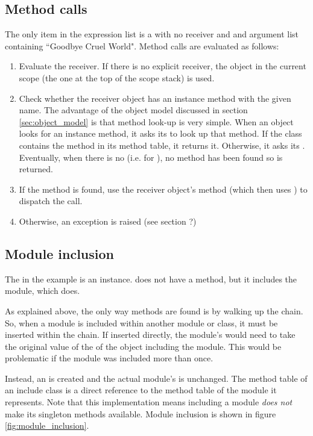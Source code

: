 \subsection{Method calls}

The only item in the expression list is a  with no receiver and and argument list containing ``Goodbye Cruel World". Method calls are evaluated as follows:

\begin{enumerate}
  \item Evaluate the receiver. If there is no explicit receiver, the  object in the current scope (the one at the top of the scope stack) is used.
  \item Check whether the receiver object has an instance method with the given name. The advantage of the object model discussed in section \ref{sec:object_model} is that method look-up is very simple. When an object looks for an instance method, it asks its  to look up that method. If the class contains the method in its method table, it returns it. Otherwise, it asks its . Eventually, when there is no  (i.e. for ), no method has been found so  is returned.
  \item If the method is found, use the receiver object's  method (which then uses ) to dispatch the call.
  \item Otherwise, an exception is raised (see section ?)
\end{enumerate}

\subsection{Module inclusion}

The  in the example is an  instance.  does not have a  method, but it includes the  module, which does.

As explained above, the only way methods are found is by walking up the  chain. So, when a module is included within another module or class, it must be inserted within the  chain. If inserted directly, the module's  would need to take the original value of the  of the object including the module. This would be problematic if the module was included more than once.

Instead, an  is created and the actual module's  is unchanged. The method table of an include class is a direct reference to the method table of the module it represents. Note that this implementation means including a module \textit{does not} make its singleton methods available. Module inclusion is shown in figure \ref{fig:module_inclusion}.

